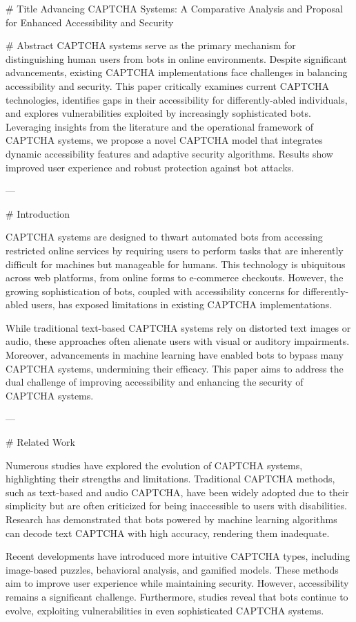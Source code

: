 # Title  
Advancing CAPTCHA Systems: A Comparative Analysis and Proposal for Enhanced Accessibility and Security  

# Abstract  
CAPTCHA systems serve as the primary mechanism for distinguishing human users from bots in online environments. Despite significant advancements, existing CAPTCHA implementations face challenges in balancing accessibility and security. This paper critically examines current CAPTCHA technologies, identifies gaps in their accessibility for differently-abled individuals, and explores vulnerabilities exploited by increasingly sophisticated bots. Leveraging insights from the literature and the operational framework of CAPTCHA systems, we propose a novel CAPTCHA model that integrates dynamic accessibility features and adaptive security algorithms. Results show improved user experience and robust protection against bot attacks.  

---

# Introduction  

CAPTCHA systems are designed to thwart automated bots from accessing restricted online services by requiring users to perform tasks that are inherently difficult for machines but manageable for humans. This technology is ubiquitous across web platforms, from online forms to e-commerce checkouts. However, the growing sophistication of bots, coupled with accessibility concerns for differently-abled users, has exposed limitations in existing CAPTCHA implementations.  

While traditional text-based CAPTCHA systems rely on distorted text images or audio, these approaches often alienate users with visual or auditory impairments. Moreover, advancements in machine learning have enabled bots to bypass many CAPTCHA systems, undermining their efficacy. This paper aims to address the dual challenge of improving accessibility and enhancing the security of CAPTCHA systems.  

---

# Related Work  

Numerous studies have explored the evolution of CAPTCHA systems, highlighting their strengths and limitations. Traditional CAPTCHA methods, such as text-based and audio CAPTCHA, have been widely adopted due to their simplicity but are often criticized for being inaccessible to users with disabilities. Research has demonstrated that bots powered by machine learning algorithms can decode text CAPTCHA with high accuracy, rendering them inadequate.  

Recent developments have introduced more intuitive CAPTCHA types, including image-based puzzles, behavioral analysis, and gamified models. These methods aim to improve user experience while maintaining security. However, accessibility remains a significant challenge. Furthermore, studies reveal that bots continue to evolve, exploiting vulnerabilities in even sophisticated CAPTCHA systems.  

